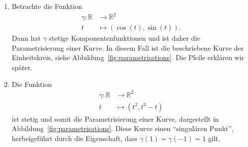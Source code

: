 \documentclass[../main.tex]{subfiles}
\begin{document}
\begin{example}
  \leavevmode
  \begin{enumerate}[(1)]
    \item 
      Betrachte die Funktion
      \begin{align*}
        \gamma \colon \mathbb{R} & \to \mathbb{R}^2 \\
        t & \mapsto (\cos(t), \sin(t)).
      \end{align*}
      Dann hat $\gamma$ stetige
      Komponentenfunktionen und ist
      daher die Parametrisierung einer Kurve.
      In diesem Fall ist die beschriebene Kurve
      der Einheitskreis, siehe Abbildung~\ref{fig:parametrisations}.
      Die Pfeile erklären wir später.
    \item Die Funktion
      \begin{align*}
        \gamma \colon \mathbb{R} & \to \mathbb{R}^2 \\
        t & \mapsto (t^2, t^3 - t)
      \end{align*}
      ist stetig und somit die Parametrisierung einer Kurve,
      dargestellt in Abbildung~\ref{fig:parametrisations}.
      Diese Kurve einen ``singulären Punkt'',
      herbeigeführt durch die Eigenschaft,
      dass $\gamma(1) = \gamma(-1) = 1$ gilt.
  \end{enumerate}
\end{example}
\end{document}
